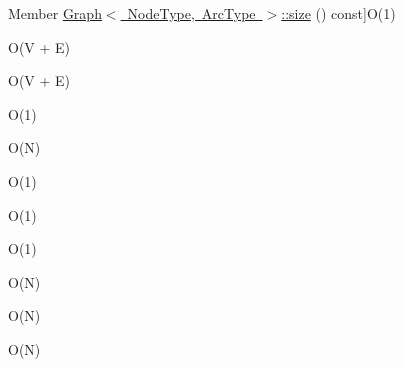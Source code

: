 \begin{DoxyRefList}
%
Member \mbox{\hyperlink{classGraph_af9593d4a5ff4274efaf429cb4f9e57cc}{Graph$<$ Node\+Type, Arc\+Type $>$\+:\+:size}} () const]O(1)  
\item[\label{BigOh__BigOh000090}%
\Hypertarget{BigOh__BigOh000090}%
Member \mbox{\hyperlink{classGraph_a1fe5121d6528fdea3f243321b3fa3a49}{Graph$<$ Node\+Type, Arc\+Type $>$\+:\+:to\+String}} () const]O(V + E)  
\item[\label{BigOh__BigOh000041}%
\Hypertarget{BigOh__BigOh000041}%
Member \mbox{\hyperlink{classGraph_af5a604e5e9e4d68dbc10b312e59f678f}{Graph$<$ Node\+Type, Arc\+Type $>$\+:\+:$\sim$\+Graph}} ()]O(V + E)  
\item[\label{BigOh__BigOh000103}%
\Hypertarget{BigOh__BigOh000103}%
Member \mbox{\hyperlink{classVector_ab901606bf3a8019c986f0cf9a9f298dc}{Vector$<$ Value\+Type $>$\+:\+:add}} (const Value\+Type \&value)]O(1)  
\item[\label{BigOh__BigOh000104}%
\Hypertarget{BigOh__BigOh000104}%
Member \mbox{\hyperlink{classVector_a7e05c14d67a60defeb6723b5704967a6}{Vector$<$ Value\+Type $>$\+:\+:add\+All}} (const Vector$<$ Value\+Type $>$ \&v)]O(\+N)  
\item[\label{BigOh__BigOh000105}%
\Hypertarget{BigOh__BigOh000105}%
Member \mbox{\hyperlink{classVector_a2bad145b40a82c36986f67610313658d}{Vector$<$ Value\+Type $>$\+:\+:back}} ()]O(1)  
\item[\label{BigOh__BigOh000106}%
\Hypertarget{BigOh__BigOh000106}%
Member \mbox{\hyperlink{classVector_adc761c91bdacd01bed5c96e25fd9486a}{Vector$<$ Value\+Type $>$\+:\+:back}} () const]O(1)  
\item[\label{BigOh__BigOh000107}%
\Hypertarget{BigOh__BigOh000107}%
Member \mbox{\hyperlink{classVector_ac8bb3912a3ce86b15842e79d0b421204}{Vector$<$ Value\+Type $>$\+:\+:clear}} ()]O(1)  
\item[\label{BigOh__BigOh000108}%
\Hypertarget{BigOh__BigOh000108}%
Member \mbox{\hyperlink{classVector_a6fbc1a150987e7e5320d244a3baeb560}{Vector$<$ Value\+Type $>$\+:\+:contains}} (const Value\+Type \&value) const]O(\+N)  
\item[\label{BigOh__BigOh000109}%
\Hypertarget{BigOh__BigOh000109}%
Member \mbox{\hyperlink{classVector_a9552fd9e921fc047fdd59e59d82e88ef}{Vector$<$ Value\+Type $>$\+:\+:ensure\+Capacity}} (int cap)]O(\+N)  
\item[\label{BigOh__BigOh000110}%
\Hypertarget{BigOh__BigOh000110}%
Member \mbox{\hyperlink{classVector_ad25fe1a007a2f00611d831198a1a86ea}{Vector$<$ Value\+Type $>$\+:\+:equals}} (const Vector$<$ Value\+Type $>$ \&v) const]O(\+N)  

\end{DoxyRefList}
